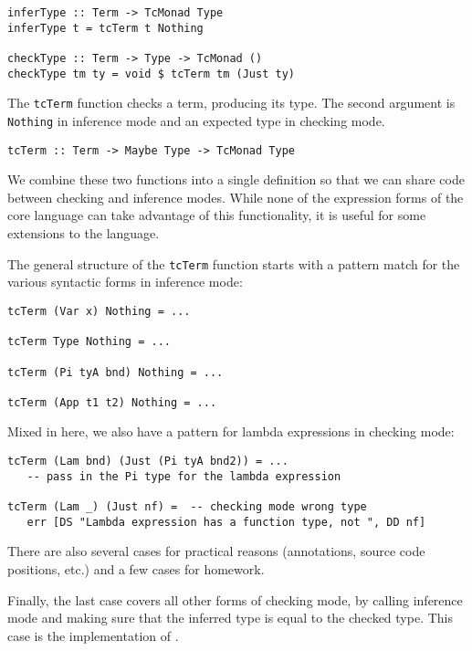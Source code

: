 \documentclass{article}
\newcommand\cd[1]{\lstinline[language=Haskell]{#1}}
\theoremstyle{definition}
\begin{document}
\begin{verbatim}
inferType :: Term -> TcMonad Type
inferType t = tcTerm t Nothing

checkType :: Term -> Type -> TcMonad ()
checkType tm ty = void $ tcTerm tm (Just ty)
\end{verbatim}

The \texttt{tcTerm} function checks a term, producing its type. The
second argument is \texttt{Nothing} in inference mode and an expected
type in checking mode.

\begin{verbatim}
tcTerm :: Term -> Maybe Type -> TcMonad Type
\end{verbatim}

We combine these two functions into a single definition so that we can share
code between checking and inference modes. While none of the expression forms
of the core language can take advantage of this functionality, it is useful
for some extensions to the language.

The general structure of the \cd{tcTerm} function starts with a pattern match
for the various syntactic forms in inference mode:

\begin{verbatim}
tcTerm (Var x) Nothing = ...

tcTerm Type Nothing = ...

tcTerm (Pi tyA bnd) Nothing = ...

tcTerm (App t1 t2) Nothing = ...

\end{verbatim}

Mixed in here, we also have a pattern for lambda expressions in checking
mode:

\begin{verbatim}
tcTerm (Lam bnd) (Just (Pi tyA bnd2)) = ...
   -- pass in the Pi type for the lambda expression

tcTerm (Lam _) (Just nf) =  -- checking mode wrong type
   err [DS "Lambda expression has a function type, not ", DD nf]
\end{verbatim}

There are also several cases for practical reasons (annotations, source code
positions, etc.) and a few cases for homework.

Finally, the last case covers all other forms of checking mode, by
calling inference mode and making sure that the inferred type is equal
to the checked type. This case is the implementation of .
\end{document}

